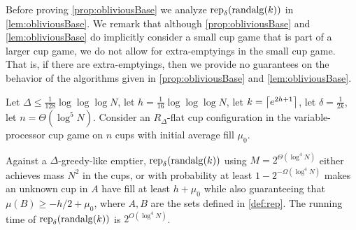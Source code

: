 Before proving \cref{prop:obliviousBase} we analyze
$\operatorname{\text{\textup{rep}}}_{\delta}(\operatorname{\text{\textup{randalg}}}(k))$ in \cref{lem:obliviousBase}. We
remark that although \cref{prop:obliviousBase} and
\cref{lem:obliviousBase} do implicitly consider a small cup game
that is part of a larger cup game, we do not allow for
extra-emptyings in the small cup game. That is, if there are
extra-emptyings, then we provide no guarantees on the behavior of
the algorithms given in \cref{prop:obliviousBase} and
\cref{lem:obliviousBase}.
\begin{lemma}
  \label{lem:obliviousBase}
  Let $\Delta \le \frac{1}{128}\log\log\log N$, let $h =
  \frac{1}{16}\log\log\log N$, let $k=\left\lceil e^{2h+1} \right\rceil$, let
  $\delta = \frac{1}{2k}$, let $n = \Theta(\log^5 N)$. Consider an
  $R_\Delta$-flat cup configuration in the variable-processor cup
  game on $n$ cups with initial average fill $\mu_0$.

  Against a $\Delta$-greedy-like emptier,
  $\operatorname{\text{\textup{rep}}}_{\delta}(\operatorname{\text{\textup{randalg}}}(k))$ using $M = 2^{\Theta(\log^4 N)}$
  either achieves mass $N^2$ in the cups, or with probability at
  least $1-2^{-\Omega(\log^4 N)}$ makes an unknown cup in $A$
  have fill at least $h+\mu_0$ while also
  guaranteeing that $\mu(B) \ge -h/2 + \mu_0$, where $A,B$ are
  the sets defined in \cref{def:rep}. The running time of
  $\operatorname{\text{\textup{rep}}}_{\delta}(\operatorname{\text{\textup{randalg}}}(k))$ is $2^{O(\log^4 N)}$.
\end{lemma}
